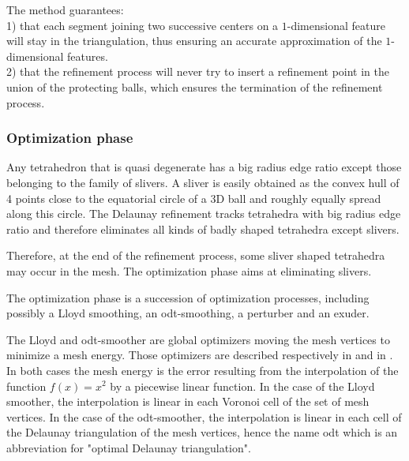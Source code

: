 The method guarantees:\\
1) that each segment joining
two successive centers on a $1$-dimensional feature will stay in the triangulation,
thus ensuring an accurate approximation of  the $1$-dimensional features. \\
2) that the refinement process will never try to insert a refinement point in the union of the
protecting balls, which ensures the termination of the refinement process.



\subsubsection{Optimization phase}

Any tetrahedron that is quasi degenerate has a big radius edge ratio except
those belonging to the family of slivers.  A sliver is easily obtained 
as the convex hull of 4 points close to the equatorial circle of a 3D
ball and roughly equally spread along this circle.
The Delaunay refinement tracks tetrahedra with big radius edge ratio 
and therefore eliminates all kinds of 
 badly shaped tetrahedra except slivers.

Therefore, at the end of the refinement process,
some sliver shaped tetrahedra may occur in the mesh.
The optimization phase aims at eliminating slivers.

The optimization phase is a succession of optimization processes,
including possibly a Lloyd smoothing, an odt-smoothing,
a perturber and an exuder.

The  Lloyd and odt-smoother are global optimizers
 moving the  mesh vertices to  minimize  
a   mesh energy.   Those optimizers are described respectively in 
\cite{cgal:dfg-cvtaa-99t, cgal:dw-tmgob-02} and  in \cite{cgal::c-mssbo-04,cgal:acyd-vtm-05}.
In both cases the mesh energy
is  the   error  resulting from the interpolation 
of the function $f(x) =x^2$ by a  piecewise linear function.
In the case of the Lloyd smoother,
the interpolation  is  linear in each Voronoi cell of the set of  mesh vertices.
In the case of the odt-smoother,  the interpolation is linear in each cell 
of the Delaunay triangulation of the  mesh vertices,
hence the name odt which is an  abbreviation for "optimal Delaunay triangulation".


